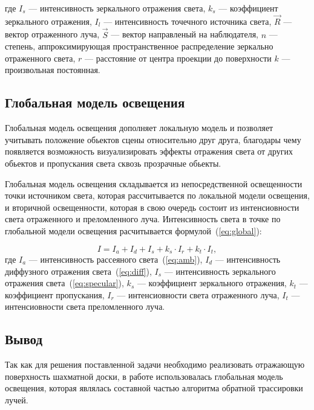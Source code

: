 \begin{enumerate}[label=\arabic*)]
	\noindent где 
	$I_{s}$ --- интенсивность зеркального отражения света,
	$k_{s}$ --- коэффициент зеркального отражения,
	$I_{l}$ --- интенсивность точечного источника света,
	$\overrightarrow{R}$ --- вектор отраженного луча, 
	$\overrightarrow{S}$ --- вектор направленый на наблюдателя,
	$n$ ---  степень, аппроксимирующая пространственное распределение зеркально отраженного света,
	$r$ --- расстояние от центра проекции до поверхности
	$k$ --- произвольная постоянная.
	
	
\end{enumerate}

\subsection{Глобальная модель освещения}
Глобальная модель освещения дополняет локальную модель и позволяет учитывать положение обьектов сцены относительно друг друга, благодары чему появляется возможность визуализировать эффекты отражения света от других обьектов и пропускания света сквозь прозрачные обьекты.

Глобальная модель освещения складывается из непосредственной освещенности точки источником света, которая рассчитывается по локальной модели освещения, и вторичной освещенности, которая в свою очередь состоит из интенсиовности света отраженного и преломленного луча. Интенсивность света в точке по глобальной модели освещения расчитывается формулой~(\ref{eq:global}):

\begin{equation}\label{global}
	I = I_{a} + I_{d} + I_{s} + k_{s} \cdot I_{r} + k_{t} \cdot I_{t},
\end{equation}
\noindent где 
	$I_{a}$ --- интенсивность рассеяного света~(\ref{eq:amb}), 
	$I_{d}$ --- интенсивность диффузного отражения света~(\ref{eq:diff}), 
	$I_{s}$ --- интенсивность зеркального отражения света~(\ref{eq:specular}),
	$k_{s}$ --- коэффициент зеркального отражения,
	$k_{t}$ --- коэффициент пропускания,
	$I_{r}$ --- интенсиовности света отраженного луча,
	$I_{t}$ --- интенсиовности света преломленного луча.


\subsection*{Вывод}
Так как для решения поставленной задачи необходимо реализовать отражающую поверхность шахматной доски, в работе использовалась глобальная модель освещения, которая являлась составной частью алгоритма обратной трассировки лучей.







\clearpage
